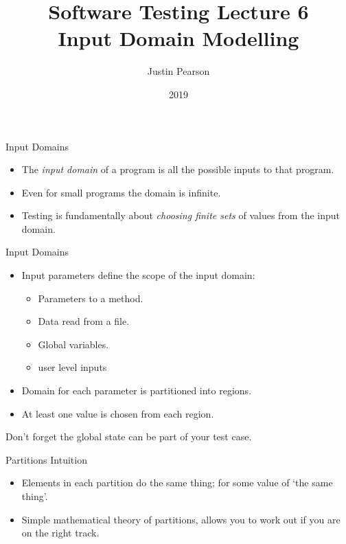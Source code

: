 \documentclass{beamer}
\title{Software Testing  Lecture 6 \\ Input Domain Modelling}
\author{Justin Pearson}
\date{2019}
\begin{document}
\lstset{language=C}

\begin{frame}
  \maketitle
\end{frame}
\begin{frame}{Input Domains}
  \begin{itemize}
  \item The {\it input domain} of a program is all the possible inputs to
    that program.
  \item Even for small programs the domain is infinite.
  \item Testing is fundamentally about {\em choosing finite sets} of
    values from the input domain.
  \end{itemize}
  
\end{frame}
\begin{frame}{Input Domains}
  \begin{itemize}
  \item Input parameters define the scope of the input domain:
    \begin{itemize}
    \item Parameters to a method.
    \item Data read from a file.
    \item Global variables.
    \item user level inputs
    \end{itemize}
  \item Domain for each parameter is partitioned into regions.
  \item At least one value is chosen from each region.
  \end{itemize}
  Don't forget the global state can be part of your test case.  
\end{frame}
\begin{frame}{Partitions Intuition} 
  \begin{itemize}
  \item Elements in each partition do the same thing; for some value
    of  `the same thing'.
  \item Simple mathematical theory of partitions, allows you to work
    out if you are on the right track.
  \end{itemize}
\end{frame}
\end{document}
